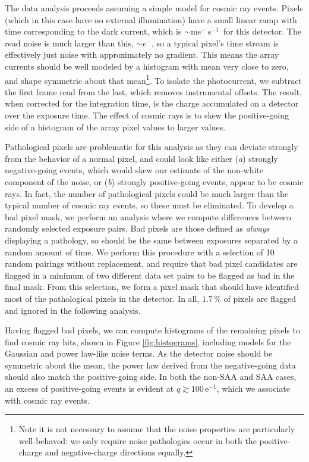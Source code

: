 \documentclass{ws-jai}
\newcommand{\e}{$e^{-}$}
\newcommand{\eps}{$e^{-} \,$s$^{-1}$}
\begin{document}
The data analysis proceeds assuming a simple model for cosmic ray
events.  Pixels (which in this case have no external illumination)
have a small linear ramp with time corresponding to the dark current,
which is $\sim$m\eps\ for this detector.  The read noise is much
larger than this, $\sim$\e, so a typical pixel's time stream is
effectively just noise with approximately no gradient.  This means the
array currents should be well modeled by a histogram with mean very
close to zero, and shape symmetric about that mean\footnote{Note it is
  not necessary to assume that the noise properties are particularly
  well-behaved: we only require noise pathologies occur in both the
  positive-charge and negative-charge directions equally.}.  To
isolate the photocurrent, we subtract the first frame read from the
last, which removes instrumental offsets.  The result, when corrected
for the integration time, is the charge accumulated on a detector over
the exposure time.  The effect of cosmic rays is to skew the
positive-going side of a histogram of the array pixel values to larger
values.

Pathological pixels are problematic for this analysis as they can
deviate strongly from the behavior of a normal pixel, and could look
like either (\textit{a}) strongly negative-going events, which would
skew our estimate of the non-white component of the noise, or
(\textit{b}) strongly positive-going events, appear to be cosmic
rays.  In fact, the number of pathological pixels could be much larger
than the typical number of cosmic ray events, so these must be
eliminated.  To develop a bad pixel mask, we perform an analysis where
we compute differences between randomly selected exposure pairs.  Bad
pixels are those defined as \emph{always} displaying a pathology, so
should be the same between exposures separated by a random amount of
time.  We perform this procedure with a selection of 10 random
pairings without replacement, and require that bad pixel candidates
are flagged in a minimum of two different data set pairs to be flagged
as bad in the final mask.  From this selection, we form a pixel mask
that should have identified most of the pathological pixels in the
detector.  In all, $1.7 \,$\% of pixels are flagged and ignored in the
following analysis.

Having flagged bad pixels, we can compute histograms of the remaining
pixels to find cosmic ray hits, shown in Figure \ref{fig:histograms},
including models for the Gaussian and power law-like noise terms.  As
the detector noise should be symmetric about the mean, the power law
derived from the negative-going data should also match the
positive-going side.  In both the non-SAA and SAA cases, an excess of
positive-going events is evident at $q \gtrsim 100 \,$e$^{-1}$, which
we associate with cosmic ray events.
\end{document}
